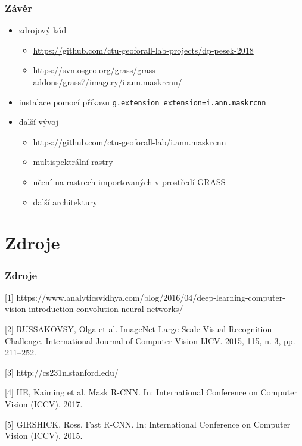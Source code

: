 \documentclass{beamer}
\begin{document}
\begin{frame}[fragile]

\frametitle{Závěr}

\begin{itemize}
	\item zdrojový kód
	\begin{itemize}
		\item \url{https://github.com/ctu-geoforall-lab-projects/dp-pesek-2018}
		\item \url{https://svn.osgeo.org/grass/grass-addons/grass7/imagery/i.ann.maskrcnn/}
	\end{itemize}
	\item instalace pomocí příkazu \verb|g.extension extension=i.ann.maskrcnn|
	\item další vývoj
	\begin{itemize}
		\item \url{https://github.com/ctu-geoforall-lab/i.ann.maskrcnn}
		\item multispektrální rastry
		\item učení na rastrech importovaných v prostředí GRASS
		\item další architektury
	\end{itemize}
\end{itemize}

\end{frame}


\section{Zdroje}

\begin{frame}

\frametitle{Zdroje}

[1] https://www.analyticsvidhya.com/blog/2016/04/deep-learning-computer-vision-introduction-convolution-neural-networks/

[2] RUSSAKOVSY, Olga et al.
ImageNet Large Scale Visual Recognition
Challenge. International Journal of Computer Vision IJCV. 2015, 115, n. 3,
pp. 211–252.

[3] http://cs231n.stanford.edu/

[4] HE, Kaiming et al. Mask R-CNN. In: International Conference on Computer
Vision (ICCV). 2017.

[5] GIRSHICK, Ross. Fast R-CNN. In: International Conference on Computer
Vision (ICCV). 2015.

\end{frame}
\end{document}
